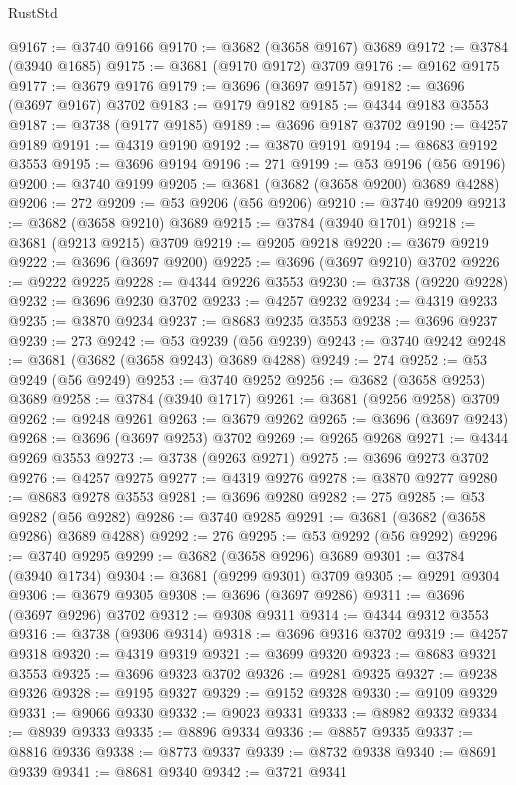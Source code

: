 \begin{lexlean}{RustStd}
\begin{coremodule}
@9167 := @3740 @9166
@9170 := @3682 (@3658 @9167) @3689
@9172 := @3784 (@3940 @1685)
@9175 := @3681 (@9170 @9172) @3709
@9176 := @9162 @9175
@9177 := @3679 @9176
@9179 := @3696 (@3697 @9157)
@9182 := @3696 (@3697 @9167) @3702
@9183 := @9179 @9182
@9185 := @4344 @9183 @3553
@9187 := @3738 (@9177 @9185)
@9189 := @3696 @9187 @3702
@9190 := @4257 @9189
@9191 := @4319 @9190
@9192 := @3870 @9191
@9194 := @8683 @9192 @3553
@9195 := @3696 @9194
@9196 := 271
@9199 := @53 @9196 (@56 @9196)
@9200 := @3740 @9199
@9205 := @3681 (@3682 (@3658 @9200) @3689 @4288)
@9206 := 272
@9209 := @53 @9206 (@56 @9206)
@9210 := @3740 @9209
@9213 := @3682 (@3658 @9210) @3689
@9215 := @3784 (@3940 @1701)
@9218 := @3681 (@9213 @9215) @3709
@9219 := @9205 @9218
@9220 := @3679 @9219
@9222 := @3696 (@3697 @9200)
@9225 := @3696 (@3697 @9210) @3702
@9226 := @9222 @9225
@9228 := @4344 @9226 @3553
@9230 := @3738 (@9220 @9228)
@9232 := @3696 @9230 @3702
@9233 := @4257 @9232
@9234 := @4319 @9233
@9235 := @3870 @9234
@9237 := @8683 @9235 @3553
@9238 := @3696 @9237
@9239 := 273
@9242 := @53 @9239 (@56 @9239)
@9243 := @3740 @9242
@9248 := @3681 (@3682 (@3658 @9243) @3689 @4288)
@9249 := 274
@9252 := @53 @9249 (@56 @9249)
@9253 := @3740 @9252
@9256 := @3682 (@3658 @9253) @3689
@9258 := @3784 (@3940 @1717)
@9261 := @3681 (@9256 @9258) @3709
@9262 := @9248 @9261
@9263 := @3679 @9262
@9265 := @3696 (@3697 @9243)
@9268 := @3696 (@3697 @9253) @3702
@9269 := @9265 @9268
@9271 := @4344 @9269 @3553
@9273 := @3738 (@9263 @9271)
@9275 := @3696 @9273 @3702
@9276 := @4257 @9275
@9277 := @4319 @9276
@9278 := @3870 @9277
@9280 := @8683 @9278 @3553
@9281 := @3696 @9280
@9282 := 275
@9285 := @53 @9282 (@56 @9282)
@9286 := @3740 @9285
@9291 := @3681 (@3682 (@3658 @9286) @3689 @4288)
@9292 := 276
@9295 := @53 @9292 (@56 @9292)
@9296 := @3740 @9295
@9299 := @3682 (@3658 @9296) @3689
@9301 := @3784 (@3940 @1734)
@9304 := @3681 (@9299 @9301) @3709
@9305 := @9291 @9304
@9306 := @3679 @9305
@9308 := @3696 (@3697 @9286)
@9311 := @3696 (@3697 @9296) @3702
@9312 := @9308 @9311
@9314 := @4344 @9312 @3553
@9316 := @3738 (@9306 @9314)
@9318 := @3696 @9316 @3702
@9319 := @4257 @9318
@9320 := @4319 @9319
@9321 := @3699 @9320
@9323 := @8683 @9321 @3553
@9325 := @3696 @9323 @3702
@9326 := @9281 @9325
@9327 := @9238 @9326
@9328 := @9195 @9327
@9329 := @9152 @9328
@9330 := @9109 @9329
@9331 := @9066 @9330
@9332 := @9023 @9331
@9333 := @8982 @9332
@9334 := @8939 @9333
@9335 := @8896 @9334
@9336 := @8857 @9335
@9337 := @8816 @9336
@9338 := @8773 @9337
@9339 := @8732 @9338
@9340 := @8691 @9339
@9341 := @8681 @9340
@9342 := @3721 @9341

\end{coremodule}
\end{lexlean}
